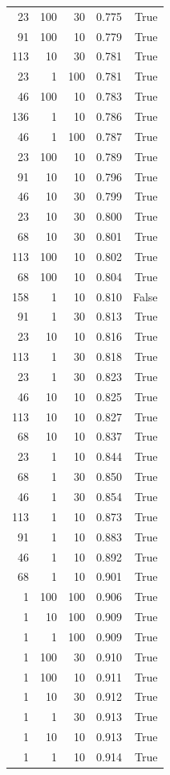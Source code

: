 \begin{tabular}{rrrrr}
23 & 100 & 30 & 0.775 & True \\
91 & 100 & 10 & 0.779 & True \\
113 & 10 & 30 & 0.781 & True \\
23 & 1 & 100 & 0.781 & True \\
46 & 100 & 10 & 0.783 & True \\
136 & 1 & 10 & 0.786 & True \\
46 & 1 & 100 & 0.787 & True \\
23 & 100 & 10 & 0.789 & True \\
91 & 10 & 10 & 0.796 & True \\
46 & 10 & 30 & 0.799 & True \\
23 & 10 & 30 & 0.800 & True \\
68 & 10 & 30 & 0.801 & True \\
113 & 100 & 10 & 0.802 & True \\
68 & 100 & 10 & 0.804 & True \\
158 & 1 & 10 & 0.810 & False \\
91 & 1 & 30 & 0.813 & True \\
23 & 10 & 10 & 0.816 & True \\
113 & 1 & 30 & 0.818 & True \\
23 & 1 & 30 & 0.823 & True \\
46 & 10 & 10 & 0.825 & True \\
113 & 10 & 10 & 0.827 & True \\
68 & 10 & 10 & 0.837 & True \\
23 & 1 & 10 & 0.844 & True \\
68 & 1 & 30 & 0.850 & True \\
46 & 1 & 30 & 0.854 & True \\
113 & 1 & 10 & 0.873 & True \\
91 & 1 & 10 & 0.883 & True \\
46 & 1 & 10 & 0.892 & True \\
68 & 1 & 10 & 0.901 & True \\
1 & 100 & 100 & 0.906 & True \\
1 & 10 & 100 & 0.909 & True \\
1 & 1 & 100 & 0.909 & True \\
1 & 100 & 30 & 0.910 & True \\
1 & 100 & 10 & 0.911 & True \\
1 & 10 & 30 & 0.912 & True \\
1 & 1 & 30 & 0.913 & True \\
1 & 10 & 10 & 0.913 & True \\
1 & 1 & 10 & 0.914 & True \\
\bottomrule
\end{tabular}
